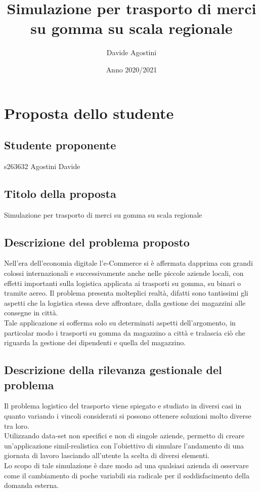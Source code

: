 \documentclass[a4paper,12pt]{report}
\begin{document}
\title{Simulazione per trasporto di merci su gomma su scala regionale }\author{Davide Agostini}\date{Anno 2020/2021}



\clearpage
\null
\thispagestyle{empty}
\clearpage

\tableofcontents

\clearpage
\null
\thispagestyle{empty}
\clearpage

\chapter*{Proposta dello studente}
\section*{Studente proponente}
s263632 Agostini Davide
\section*{Titolo della proposta}
Simulazione per trasporto di merci su gomma su scala regionale
\section*{Descrizione del problema proposto}
Nell’era dell’economia digitale l’e-Commerce si è affermata dapprima con grandi colossi internazionali e successivamente anche nelle piccole aziende locali, con effetti importanti sulla logistica applicata ai trasporti su gomma, su binari o tramite aereo.
Il problema presenta molteplici realtà, difatti sono tantissimi gli aspetti che la logistica stessa deve affrontare, dalla gestione dei magazzini alle consegne in città.\\
Tale applicazione si sofferma solo su determinati aspetti dell'argomento, in particolar modo i trasporti su gomma da magazzino a città e tralascia ciò che riguarda la gestione dei dipendenti e quella del magazzino.
\section*{Descrizione della rilevanza gestionale del problema}
Il problema logistico del trasporto viene spiegato e studiato in diversi casi in quanto variando i vincoli considerati si possono ottenere soluzioni molto diverse tra loro.\\
Utilizzando data-set non specifici e non di singole aziende, permetto di creare un'applicazione simil-realistica con l'obiettivo di simulare l'andamento di una giornata di lavoro lasciando all'utente la scelta di diversi elementi.\\
Lo scopo di tale simulazione è dare modo ad una qualsiasi azienda di osservare come il cambiamento di poche variabili sia radicale per il soddisfacimento della domanda esterna.
\end{document}
